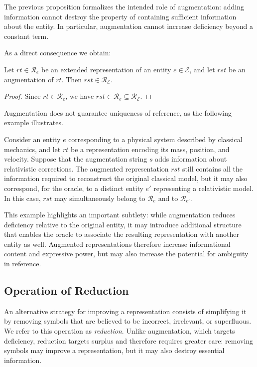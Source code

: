 The previous proposition formalizes the intended role of augmentation: adding information cannot destroy the property of containing sufficient information about the entity. In particular, augmentation cannot increase deficiency beyond a constant term.

As a direct consequence we obtain:

\begin{corollary}
Let $rt \in \mathcal{R}_{e}$ be an extended representation of an entity $e \in \mathcal{E}$, and let $rst$ be an augmentation of $rt$. Then $rst \in \mathcal{R}_{\mathcal{E}}$.
\end{corollary}

\begin{proof}
Since $rt \in \mathcal{R}_{e}$, we have $rst \in \mathcal{R}_{e} \subseteq \mathcal{R}_{\mathcal{E}}$.
\end{proof}

Augmentation does not guarantee uniqueness of reference, as the following example illustrates.

\begin{example}
Consider an entity $e$ corresponding to a physical system described by classical mechanics, and let $rt$ be a representation encoding its mass, position, and velocity. Suppose that the augmentation string $s$ adds information about relativistic corrections. The augmented representation $rst$ still contains all the information required to reconstruct the original classical model, but it may also correspond, for the oracle, to a distinct entity $e'$ representing a relativistic model. In this case, $rst$ may simultaneously belong to $\mathcal{R}_e$ and to $\mathcal{R}_{e'}$.
\end{example}

This example highlights an important subtlety: while augmentation reduces deficiency relative to the original entity, it may introduce additional structure that enables the oracle to associate the resulting representation with another entity as well. Augmented representations therefore increase informational content and expressive power, but may also increase the potential for ambiguity in reference.


\subsection*{Operation of Reduction}

An alternative strategy for improving a representation consists of simplifying it by removing symbols that are believed to be incorrect, irrelevant, or superfluous. We refer to this operation as \emph{reduction}. Unlike augmentation, which targets deficiency, reduction targets surplus and therefore requires greater care: removing symbols may improve a representation, but it may also destroy essential information.

